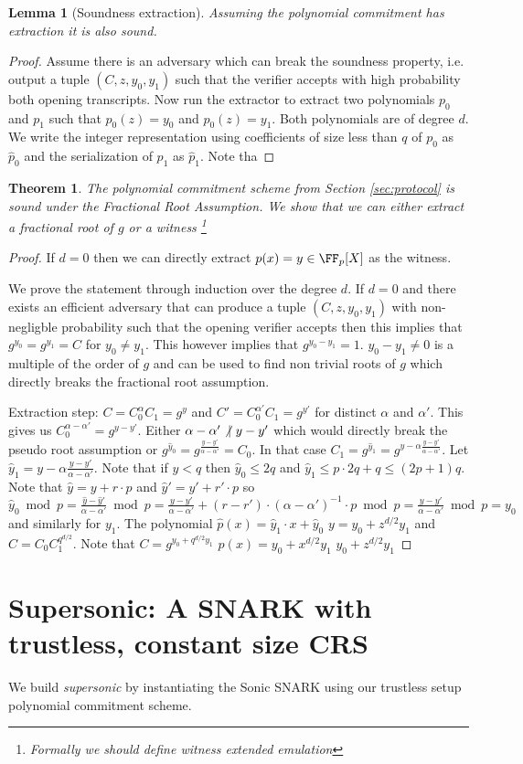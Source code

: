 \documentclass{article}
\newtheorem{theorem}{Theorem}
\newtheorem{lemma}{Lemma}
\begin{document}
\begin{lemma}[Soundness extraction]
	Assuming the polynomial commitment has extraction it is also sound.
\end{lemma}
\begin{proof}
	Assume there is an adversary which can break the soundness property, i.e. output a tuple $(C,z,y_0,y_1)$ such that the verifier accepts with high probability both opening transcripts. Now run the extractor to extract two polynomials $p_0$ and $p_1$ such that $p_0(z)=y_0$ and $p_0(z)=y_1$. Both polynomials are of degree $d$. We write the integer representation using coefficients of size less than $q$ of $p_0$ as $\hat{p}_0$ and the serialization of $p_1$ as $\hat{p}_1$. Note tha
\end{proof}
\begin{theorem}
	The polynomial commitment scheme from Section \ref{sec:protocol} is sound under the Fractional Root Assumption. We show that we can either extract a fractional root of $g$ or a witness \footnote{Formally we should define witness extended emulation }
\end{theorem}
\begin{proof}

If $d=0$ then we can directly extract $p(x)=y\in \FF_p[X]$ as the witness. 


	We prove the statement through induction over the degree $d$. If $d=0$ and there exists an efficient adversary that can produce a tuple $(C,z,y_0,y_1)$ with non-negligble probability such that the opening verifier accepts then this implies that $g^{y_0}=g^{y_1}=C$ for $y_0\neq y_1$. This however implies that $g^{y_0-y_1}=1$. $y_0-y_1\neq 0$ is a multiple of the order of $g$ and can be used to find non trivial roots of $g$ which directly breaks the fractional root assumption.



Extraction step: $C=C_0^{\alpha}C_1=g^{y}$ and $C'=C_0^{\alpha'}C_1=g^{y'}$ for distinct $\alpha$ and $\alpha'$. This gives us $C_0^{\alpha-\alpha'}=g^{y-y'}$. Either $\alpha-\alpha'\not\vert~y-y' $ which would directly break the pseudo root assumption or $g^{\hat{y}_0}=g^{\frac{y-y'}{\alpha-\alpha'}}=C_0$. In that case $C_1=g^{\hat{y}_1}=g^{y-\alpha\frac{y-y'}{\alpha-\alpha'}}$. Let $\hat{y}_1=y-\alpha\frac{y-y'}{\alpha-\alpha'}$. Note that if $y<q$ then $\hat{y}_0\leq 2q$ and $\hat{y}_1\leq p \cdot 2q +q\leq (2p+1)q$. Note that $\hat{y}=y+r\cdot p$ and $\hat{y}'=y'+r'\cdot p$ so $\hat{y}_0 \bmod p=\frac{\hat{y}-\hat{y}'}{\alpha-\alpha'}\bmod p=\frac{y-y'}{\alpha-\alpha'}+(r-r')\cdot ({\alpha-\alpha'})^{-1}\cdot p\bmod p=\frac{y-y'}{\alpha-\alpha'}\bmod p=y_0$ and similarly for $y_1$.
The polynomial $\hat{p}(x)=\hat{y}_1\cdot x+ \hat{y}_0$
$y=y_0+z^{d/2} y_1$ and $C=C_0C_1^{q^{d/2}}$. Note that $C=g^{y_0+q^{d/2}y_1}$ 
$p(x)=y_0+x^{d/2}y_1$
$y_0+z^{d/2} y_1$


\end{proof}
\section{Supersonic: A SNARK with trustless, constant size CRS}
We build \emph{supersonic} by instantiating the Sonic SNARK using our trustless setup polynomial commitment scheme.
  
\end{document}
